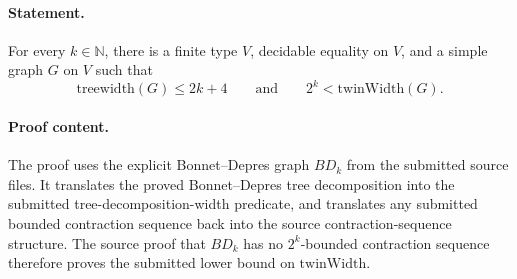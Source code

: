 \paragraph{Statement.}
For every \(k\in\mathbb{N}\), there is a finite type \(V\), decidable equality
on \(V\), and a simple graph \(G\) on \(V\) such that
\[
  \mathrm{treewidth}(G) \le 2k+4
  \qquad\text{and}\qquad
  2^k < \mathrm{twinWidth}(G).
\]

\paragraph{Proof content.}
The proof uses the explicit Bonnet--Depres graph \(BD_k\) from the submitted
source files.  It translates the proved Bonnet--Depres tree decomposition into
the submitted tree-decomposition-width predicate, and translates any submitted
bounded contraction sequence back into the source contraction-sequence
structure.  The source proof that \(BD_k\) has no \(2^k\)-bounded contraction
sequence therefore proves the submitted lower bound on
\(\mathrm{twinWidth}\).
